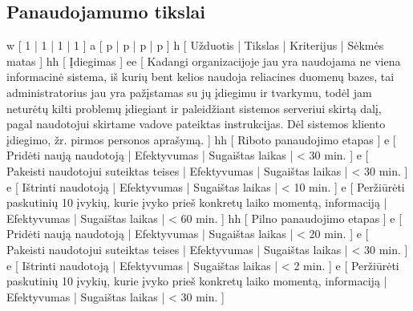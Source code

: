 \subsection{Panaudojamumo tikslai}
\xtable
{
  w [ 1 | 1 | 1 | 1 ]
  a [ p | p | p | p ]
  h [ Užduotis | Tikslas | Kriterijus | Sėkmės matas ]
  hh [ Įdiegimas ]
  ee
  [
    Kadangi organizacijoje jau yra naudojama ne viena informacinė
    sistema, iš kurių bent kelios naudoja reliacines duomenų bazes,
    tai administratorius jau yra pažįstamas su jų įdiegimu ir
    tvarkymu, todėl jam neturėtų kilti problemų įdiegiant ir paleidžiant
    sistemos serveriui skirtą dalį, pagal naudotojui skirtame vadove
    pateiktas instrukcijas. Dėl sistemos kliento įdiegimo, žr.
    pirmos personos aprašymą.
  ]
  hh [ Riboto panaudojimo etapas ]
  e [ Pridėti naują naudotoją | Efektyvumas | Sugaištas laikas | < 30 min. ]
  e [ Pakeisti naudotojui suteiktas teises | Efektyvumas | Sugaištas laikas | < 30 min. ]
  e [ Ištrinti naudotoją | Efektyvumas | Sugaištas laikas | < 10 min. ]
  e [ Peržiūrėti paskutinių 10 įvykių, kurie įvyko prieš konkretų laiko
  momentą, informaciją | Efektyvumas | Sugaištas laikas | < 60 min. ]
  hh [ Pilno panaudojimo etapas ]
  e [ Pridėti naują naudotoją | Efektyvumas | Sugaištas laikas | < 20 min. ]
  e [ Pakeisti naudotojui suteiktas teises | Efektyvumas | Sugaištas laikas | < 30 min. ]
  e [ Ištrinti naudotoją | Efektyvumas | Sugaištas laikas | < 2 min. ]
  e [ Peržiūrėti paskutinių 10 įvykių, kurie įvyko prieš konkretų laiko
  momentą, informaciją | Efektyvumas | Sugaištas laikas | < 30 min. ]
}
